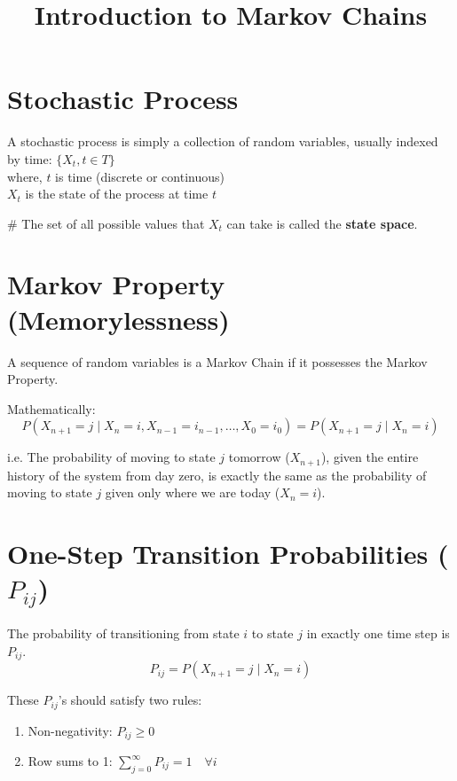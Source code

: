 \documentclass[12pt,a4paper]{article}
\title{\vspace{-2cm}\textbf{\textcolor{primary}{Introduction to Markov Chains}}}
\date{} %
\begin{document}
\setlength{\jot}{12pt} 

\maketitle
\vspace{-1.5cm} %

\section*{\textcolor{secondary}{Stochastic Process}}
A stochastic process is simply a collection of random variables, usually indexed by time: $\{X_t, t \in T\}$\\
where, $t$ is time (discrete or continuous)\\
$X_t$ is the state of the process at time $t$

\# The set of all possible values that $X_t$ can take is called the \textbf{state space}.

\section*{\textcolor{secondary}{Markov Property (Memorylessness)}}
A sequence of random variables is a Markov Chain if it possesses the Markov Property.

Mathematically:
\[ P(X_{n+1} = j \mid X_n = i, X_{n-1} = i_{n-1}, \dots, X_0 = i_0) = P(X_{n+1} = j \mid X_n = i) \]

i.e. The probability of moving to state $j$ tomorrow ($X_{n+1}$), given the entire history of the system from day zero, is exactly the same as the probability of moving to state $j$ given only where we are today ($X_n = i$).

\section*{\textcolor{secondary}{One-Step Transition Probabilities ($P_{ij}$)}}
The probability of transitioning from state $i$ to state $j$ in exactly one time step is $P_{ij}$.
\[ P_{ij} = P(X_{n+1} = j \mid X_n = i) \]

These $P_{ij}$'s should satisfy two rules:
\begin{enumerate}
    \item Non-negativity: $P_{ij} \geq 0$
    \item Row sums to 1: $\sum_{j=0}^{\infty} P_{ij} = 1 \quad \forall i$
\end{enumerate}
\end{document}
